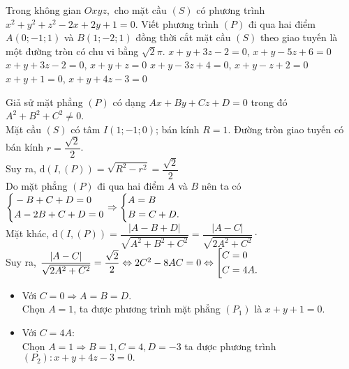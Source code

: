 \begin{ex}%
Trong không gian $ Oxyz, $	cho mặt cầu $ (S) $ có phương trình $ x^2+y^2+z^2-2x+2y+1=0 $. Viết phương trình $ (P) $ đi qua hai điểm $ A(0;-1;1) $ và $ B(1;-2;1) $ đồng thời cắt mặt cầu $ (S) $ theo giao tuyến là một đường tròn có chu vi bằng $ \sqrt{2}\pi. $
	\choice
	{$ x+y+3z-2=0$, $ x+y-5z+6=0 $}
	{$ x+y+3z-2=0$, $ x+y+z=0 $}
	{$ x+y-3z+4=0$, $ x+y-z+2=0 $}
	{\True $ x+y+1=0$, $ x+y+4z-3=0 $}
	\loigiai
	{Giả sử mặt phẳng $ (P) $ có dạng $ Ax+By+Cz+D=0 $ trong đó $ A^2+B^2+C^2\ne 0 $.\\
		Mặt cầu $ (S) $ có tâm $ I(1;-1;0) $; bán kính $ R=1. $
		Đường tròn giao tuyến có bán kính $ r=\dfrac{\sqrt{2}}{2} $.\\
		Suy ra, $ \mathrm{d}\left(I,(P)\right) =\sqrt{R^2-r^2}=\dfrac{\sqrt{2}}{2}$\\
		Do mặt phẳng $ (P) $ đi qua hai điểm $ A $ và $ B $ nên ta có $ \left\{\begin{aligned}&-B+C+D=0\\&A-2B+C+D=0\end{aligned}\right.\Rightarrow \left\{\begin{aligned}&A=B\\&B=C+D.\end{aligned}\right. $\\
	Mặt khác, $ \mathrm{d}\left(I,(P)\right) =\dfrac{\left|A-B+D\right|}{\sqrt{A^2+B^2+C^2}} = \dfrac{\left|A-C\right|}{\sqrt{2A^2+C^2}}\cdot$	\\
	Suy ra, $\dfrac{\left|A-C\right|}{\sqrt{2A^2+C^2}}=\dfrac{\sqrt{2}}{2} \Leftrightarrow 2C^2-8AC=0 \Leftrightarrow \left[\begin{aligned}&C=0\\&C=4A.\end{aligned}\right.  $
\begin{itemize}
	\item Với $ C=0 \Rightarrow A=B=D $. \\Chọn $ A = 1 $, ta được phương trình mặt phẳng $ (P_1) $ là $ x+y+1=0. $
	\item Với $ C=4A\colon $\\Chọn $ A=1 \Rightarrow B = 1, C=4,D=-3 $ ta được phương trình $ (P_2)\colon x+y+4z-3=0. $
\end{itemize}	}
\end{ex}
